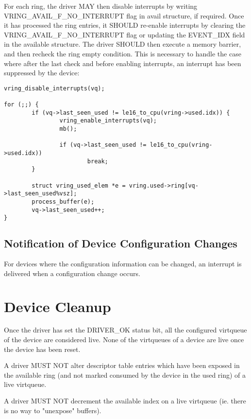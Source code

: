For each ring, the driver MAY then disable interrupts by writing
VRING_AVAIL_F_NO_INTERRUPT flag in avail structure, if required.
Once it has processed the ring entries, it SHOULD re-enable
interrupts by clearing the VRING_AVAIL_F_NO_INTERRUPT flag or updating the
EVENT_IDX field in the available structure.  The driver SHOULD then
execute a memory barrier, and then recheck the ring empty
condition. This is necessary to handle the case where after the
last check and before enabling interrupts, an interrupt has been
suppressed by the device:

\begin{lstlisting}
vring_disable_interrupts(vq);

for (;;) {
        if (vq->last_seen_used != le16_to_cpu(vring->used.idx)) {
                vring_enable_interrupts(vq);
                mb();

                if (vq->last_seen_used != le16_to_cpu(vring->used.idx))
                        break;
        }

        struct vring_used_elem *e = vring.used->ring[vq->last_seen_used%vsz];
        process_buffer(e);
        vq->last_seen_used++;
}
\end{lstlisting}

\subsection{Notification of Device Configuration Changes}\label{sec:General Initialization And Device Operation / Device Operation / Notification of Device Configuration Changes}

For devices where the configuration information can be changed, an
interrupt is delivered when a configuration change occurs.

\section{Device Cleanup}\label{sec:General Initialization And Device Operation / Device Cleanup}

Once the driver has set the DRIVER_OK status bit, all the configured
virtqueue of the device are considered live.  None of the virtqueues
of a device are live once the device has been reset.

A driver MUST NOT alter descriptor table entries which have been
exposed in the available ring (and not marked consumed by the device
in the used ring) of a live virtqueue.

A driver MUST NOT decrement the available index on a live virtqueue (ie.
there is no way to "unexpose" buffers).

